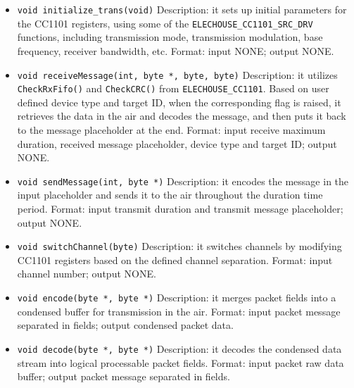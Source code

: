 \begin{itemize}
  \item \texttt{void initialize\_trans(void)}\newline
  Description: it sets up initial parameters for the CC1101 registers, using some of the \texttt{ELECHOUSE\_CC1101\_SRC\_DRV} functions, including transmission mode, transmission modulation, base frequency, receiver bandwidth, etc.\newline
  Format: input NONE; output NONE.
  \item \texttt{void receiveMessage(int, byte *, byte, byte)}\newline
  Description: it utilizes \texttt{CheckRxFifo()} and \texttt{CheckCRC()} from \texttt{ELECHOUSE\_CC1101}. Based on user defined device type and target ID, when the corresponding flag is raised, it retrieves the data in the air and decodes the message, and then puts it back to the message placeholder at the end.\newline
  Format: input receive maximum duration, received message placeholder, device type and target ID; output NONE.
  \item \texttt{void sendMessage(int, byte *)}\newline
  Description: it encodes the message in the input placeholder and sends it to the air throughout the duration time period.\newline
  Format: input transmit duration and transmit message placeholder; output NONE.
  \item \texttt{void switchChannel(byte)}\newline
  Description: it switches channels by modifying CC1101 registers based on the defined channel separation.\newline
  Format: input channel number; output NONE.
  \item \texttt{void encode(byte *, byte *)}\newline
  Description: it merges packet fields into a condensed buffer for transmission in the air.\newline
  Format: input packet message separated in fields; output condensed packet data.
  \item \texttt{void decode(byte *, byte *)}\newline
  Description: it decodes the condensed data stream into logical processable packet fields. \newline
  Format: input packet raw data buffer; output packet message separated in fields.
\end{itemize}




